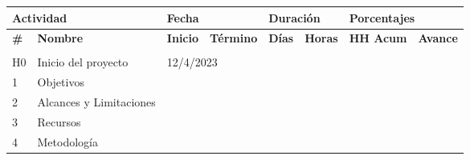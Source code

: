 \begin{longtable}[c]{@{}llllllll@{}}
	\toprule
	\multicolumn{2}{l}{\textbf{Actividad}} & \multicolumn{2}{l}{\textbf{Fecha}}              & \multicolumn{2}{l}{\textbf{Duración}} & \multicolumn{2}{l}{\textbf{Porcentajes}}                                                                       \\* \midrule
	\textbf{\#}                            & \textbf{Nombre}                                 & \textbf{Inicio}                       & \textbf{Término}                         & \textbf{Días} & \textbf{Horas} & \textbf{HH Acum} & \textbf{Avance} \\* \midrule
	\endhead
	\bottomrule
	\endfoot
	\endlastfoot
	\multicolumn{8}{c}{}                                                                                                                                                                                                                              \\* \midrule
	H0                                     & Inicio del proyecto                             & \multicolumn{2}{l}{12/4/2023}         &                                          &               &                &                                    \\
	1                                      & Objetivos                                       &                                       &                                          &               &                &                  &                 \\
	2                                      & Alcances y Limitaciones                         &                                       &                                          &               &                &                  &                 \\
	3                                      & Recursos                                        &                                       &                                          &               &                &                  &                 \\
	4                                      & Metodología                                     &                                       &                                          &               &                &                  &                 \\

\end{longtable}
